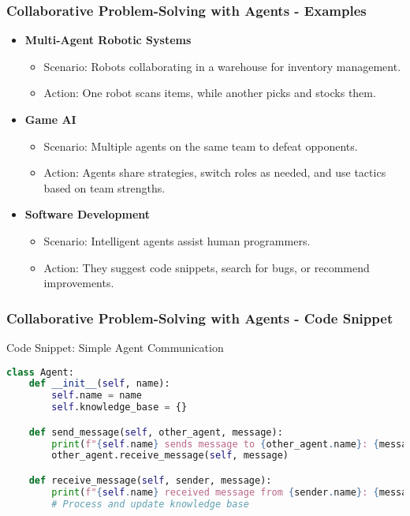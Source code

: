 \documentclass[aspectratio=169]{beamer}
\begin{document}
\begin{frame}[fragile]
    \frametitle{Collaborative Problem-Solving with Agents - Examples}
    \begin{itemize}
        \item \textbf{Multi-Agent Robotic Systems}
        \begin{itemize}
            \item Scenario: Robots collaborating in a warehouse for inventory management.
            \item Action: One robot scans items, while another picks and stocks them.
        \end{itemize}
        
        \item \textbf{Game AI}
        \begin{itemize}
            \item Scenario: Multiple agents on the same team to defeat opponents.
            \item Action: Agents share strategies, switch roles as needed, and use tactics based on team strengths.
        \end{itemize}
        
        \item \textbf{Software Development}
        \begin{itemize}
            \item Scenario: Intelligent agents assist human programmers.
            \item Action: They suggest code snippets, search for bugs, or recommend improvements.
        \end{itemize}
    \end{itemize}
\end{frame}

\begin{frame}[fragile]
    \frametitle{Collaborative Problem-Solving with Agents - Code Snippet}
    \begin{block}{Code Snippet: Simple Agent Communication}
    \begin{lstlisting}[language=Python]
class Agent:
    def __init__(self, name):
        self.name = name
        self.knowledge_base = {}

    def send_message(self, other_agent, message):
        print(f"{self.name} sends message to {other_agent.name}: {message}")
        other_agent.receive_message(self, message)

    def receive_message(self, sender, message):
        print(f"{self.name} received message from {sender.name}: {message}")
        # Process and update knowledge base
    \end{lstlisting}
    \end{block}
\end{frame}
\end{document}
